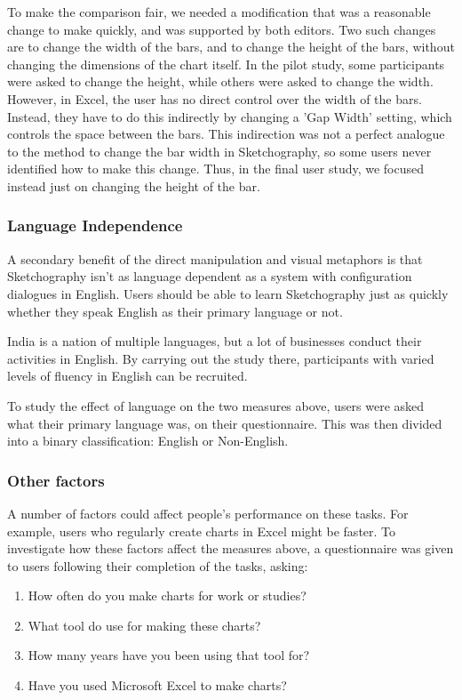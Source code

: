 To make the comparison fair, we needed a modification that was a reasonable change to make quickly, and was supported by both editors. Two such changes are to change the width of the bars, and to change the height of the bars, without changing the dimensions of the chart itself. In the pilot study, some participants were asked to change the height, while others were asked to change the width. However, in Excel, the user has no direct control over the width of the bars. Instead, they have to do this indirectly by changing a 'Gap Width' setting, which controls the space between the bars. This indirection was not a perfect analogue to the method to change the bar width in Sketchography, so some users never identified how to make this change. Thus, in the final user study, we focused instead just on changing the height of the bar.

\subsubsection*{Language Independence}
A secondary benefit of the direct manipulation and visual metaphors is that Sketchography isn't as language dependent as a system with configuration dialogues in English. Users should be able to learn Sketchography just as quickly whether they speak English as their primary language or not. 

India is a nation of multiple languages, but a lot of businesses conduct their activities in English. By carrying out the study there, participants with varied levels of fluency in English can be recruited.

To study the effect of language on the two measures above, users were asked what their primary language was, on their questionnaire. This was then divided into a binary classification: English or Non-English.

\subsubsection*{Other factors}
A number of factors could affect people's performance on these tasks. For example, users who regularly create charts in Excel might be faster. To investigate how these factors affect the measures above, a questionnaire was given to users following their completion of the tasks, asking:

\begin{enumerate}
\item How often do you make charts for work or studies?
\item What tool do use for making these charts?
\item How many years have you been using that tool for?
\item Have you used Microsoft Excel to make charts?
\end{enumerate}

